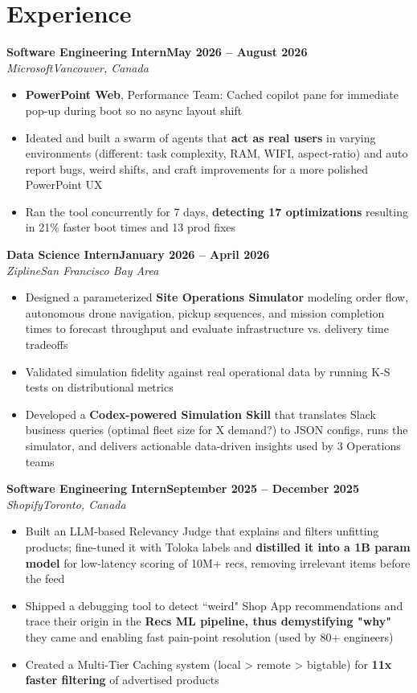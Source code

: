 \documentclass[letterpaper,10pt]{article}
\newcommand{\entry}[4]{\textbf{#1}\hfill\textbf{\small #2}\\\textit{\small #3}\hfill\textit{\small #4}\par}
\begin{document}
\section{Experience}
\entry{Software Engineering Intern}{May 2026 -- August 2026}{Microsoft}{Vancouver, Canada}
\begin{itemize}\small
\item \textbf{PowerPoint Web}, Performance Team: Cached copilot pane for immediate pop-up during boot so no async layout shift
\item Ideated and built a swarm of agents that \textbf{act as real users} in varying environments (different: task complexity, RAM, WIFI, aspect-ratio) and auto report bugs, weird shifts, and craft improvements for a more polished PowerPoint UX
\item Ran the tool concurrently for 7 days, \textbf{detecting 17 optimizations} resulting in 21\% faster boot times and 13 prod fixes
\end{itemize}\vspace{2pt}
\entry{Data Science Intern}{January 2026 -- April 2026}{Zipline}{San Francisco Bay Area}
\begin{itemize}\small
\item Designed a parameterized \textbf{Site Operations Simulator} modeling order flow, autonomous drone navigation, pickup sequences, and mission completion times to forecast throughput and evaluate infrastructure vs. delivery time tradeoffs
\item Validated simulation fidelity against real operational data by running K-S tests on distributional metrics
\item Developed a \textbf{Codex-powered Simulation Skill} that translates Slack business queries (optimal fleet size for X demand?) to JSON configs, runs the simulator, and delivers actionable data-driven insights used by 3 Operations teams
\end{itemize}\vspace{2pt}
\entry{Software Engineering Intern}{September 2025 -- December 2025}{Shopify}{Toronto, Canada}
\begin{itemize}\small
\item Built an LLM-based Relevancy Judge that explains and filters unfitting products; fine-tuned it with Toloka labels and \textbf{distilled it into a 1B param model} for low-latency scoring of 10M+ recs, removing irrelevant items before the feed
\item Shipped a debugging tool to detect ``weird" Shop App recommendations and trace their origin in the \textbf{Recs ML pipeline, thus demystifying "why"} they came and enabling fast pain-point resolution (used by 80+ engineers)
\item Created a Multi-Tier Caching system (local \textgreater{} remote \textgreater{} bigtable) for \textbf{11x faster filtering} of advertised products
\end{itemize}\vspace{2pt}
\end{document}
